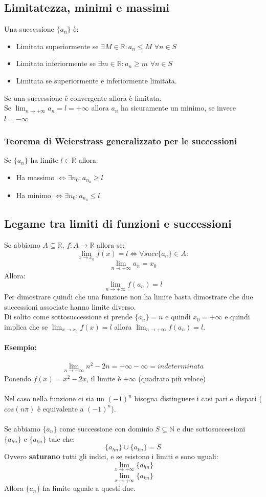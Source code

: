 \documentclass[12pt,a4paper]{article}
\begin{document}
\subsection{Limitatezza, minimi e massimi}
Una successione $\{a_n\}$ è:
\begin{itemize}
  \item Limitata superiormente se $\exists M \in \mathbb{R} : a_n \leq M$ $\forall n \in S$
  \item Limitata inferiormente se $\exists m \in \mathbb{R} : a_n \geq m$ $\forall n \in S$
  \item Limitata se superiormente e inferiormente limitata.
\end{itemize}
Se una successione è convergente allora è limitata.\\
Se $\lim_{n \to +\infty} a_n = l = +\infty$ allora $a_n$ ha sicuramente un minimo, se invece $l = -\infty$ 
\subsubsection{Teorema di Weierstrass generalizzato per le successioni}
Se $\{a_n\}$ ha limite $l \in \mathbb{R}$ allora:
\begin{itemize}
  \item Ha massimo $\Leftrightarrow \exists n_0 : a_{n_0} \geq l$ 
  \item Ha minimo $\Leftrightarrow \exists n_0 : a_{n_0} \leq l$ 
\end{itemize}
\subsection{Legame tra limiti di funzioni e successioni}
Se abbiamo $A \subseteq \mathbb{R}$, $f:A \to \mathbb{R}$ allora se:
\[
\lim_{x \to x_0} f(x) = l \Leftrightarrow \forall succ\{a_n\} \in A :
\]
\[
\lim_{n \to +\infty} a_n = x_0 
\]
Allora:
\[
\lim_{n \to +\infty} f(a_n) = l
\]
Per dimostrare quindi che una funzione non ha limite basta dimostrare che due successioni associate hanno limite diverso.\\
Di solito come sottosuccessione si prende $\{a_n\} = n$ e quindi $x_0 = +\infty$ e quindi implica che se $\lim_{x \to x_0} f(x) = l$ allora $\lim_{n \to +\infty} f(a_n) = l$.
\paragraph{Esempio:}
\[
\lim_{n \to +\infty} n^2 - 2n = +\infty -\infty = indeterminata
\]
Ponendo $f(x) = x^2 - 2x$, il limite è $+\infty$ (quadrato più veloce)\\\\
Nel caso nella funzione ci sia un $(-1)^n$ bisogna distinguere i casi pari e dispari ($cos(n\pi)$ è equivalente a $(-1)^n$).\\\\
Se abbiamo $\{a_n\}$ come successione con dominio $S \subseteq \mathbb{N}$ e due sottosuccessioni $\{a_{hn}\}$ e $\{a_{kn}\}$ tale che:
\[
\{a_{hn}\} \cup \{a_{kn}\} = S 
\]
Ovvero \textbf{saturano} tutti gli indici, e se esistono i limiti e sono uguali:
\[
\lim_{x \to +\infty} \{a_{hn}\}
\]
\[
\lim_{x \to +\infty} \{a_{kn}\}
\]
Allora $\{a_{n}\}$ ha limite uguale a questi due.
\end{document}
